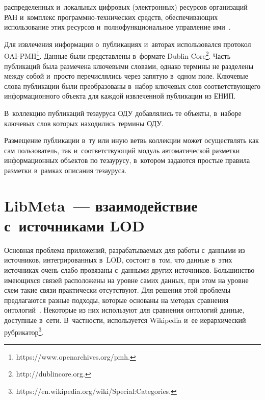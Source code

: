 \begin{multicols}{2}

\noindent
распределенных и~локальных цифровых (электронных) ресурсов организаций 
РАН и~комплекс про\-граммно-тех\-ни\-че\-ских средств, обеспе\-чи\-ва\-ющих 
использование этих ресурсов и~полнофункциональное управление 
ими~\cite{9-ser}. 

Для извлечения информации о~публикациях и~авторах 
использовался
 протокол OAI-PMH\footnote[1]{{\sf 
https://www.openarchives.org/pmh.}}. Данные были представлены в~формате Dublin 
Core\footnote[2]{{\sf http://dublincore.org.}}. 
%
Часть публикаций была размечена 
ключевыми словами, однако термины не разделены между собой и~просто 
перечислялись через запятую в~одном поле. 
%
Ключевые слова пуб\-ли\-ка\-ции 
были преобразованы в~набор ключевых слов соответствующего 
информационного объекта для каждой извлеченной публикации из ЕНИП. 

В~коллекцию публикаций тезауруса ОДУ добавлялись те объекты, в~наборе 
ключевых слов которых находились термины ОДУ. 
    
    Размещение публикации в~ту или иную ветвь коллекции может 
осуществлять как сам пользователь, так и~соответствующий модуль 
автоматической разметки информационных объектов по тезаурусу, в~котором 
задаются простые правила разметки в~рамках описания тезауруса.
    
\section{LibMeta~--- взаимодействие с~источниками LOD}

    Основная проблема приложений, разрабатыва\-емых для работы 
с~данными из источников, интегрированных в~LOD, состоит в~том, что 
данные в~этих источниках очень слабо провязаны с~данными других 
источников. Большинство имеющихся связей расположены на уровне самих 
данных, при этом на уровне схем такие связи практически отсутствуют. Для 
решения этой проблемы предлагаются разные подходы, которые основаны на 
методах сравнения онтологий~\cite{1-ser, 4-ser}. Некоторые из них 
используют для сравнения онтологий данные, доступные в~сети. В~част\-ности, 
используется Wikipedia и~ее иерархический рубрикатор\footnote{{\sf  
https://en.wikipedia.org/wiki/Special:Categories.}}. 
    

\end{multicols}
